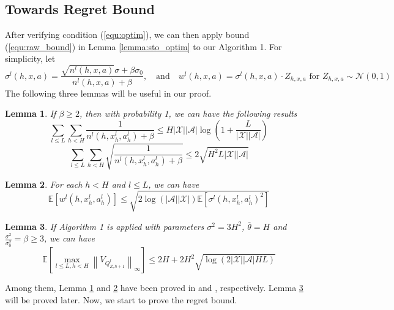 \documentclass[letterpaper]{article} %
\newcommand{\Sp}[1]{\left(#1\right)}
\newcommand{\Mp}[1]{\left[#1\right]}
\newcommand{\abs}[1]{\left|#1\right|}
\newcommand{\Norm}[1]{\left\|#1\right\|}
\newcommand{\E}{\mathbb{E}}
\newcommand{\aX}{\abs{\mathcal{X}}}
\newcommand{\aA}{\abs{\mathcal{A}}}
\newtheorem{lemma}{Lemma}
\theoremstyle{definition}
\begin{document}
\subsection{Towards Regret Bound}
After verifying condition (\ref{equ:optim}), we can then apply bound (\ref{equ:raw_bound}) in Lemma \ref{lemma:sto_optim} to our Algorithm 1. For simplicity, let
\begin{equation}
\label{equ:simp}
\sigma^l\Sp{h, x, a}=\frac{\sqrt{n^l\Sp{h, x, a}}\sigma+\beta\sigma_0}{n^l\Sp{h, x, a}+\beta},\quad\text{and}\quad w^l\Sp{h, x, a}=\sigma^l\Sp{h, x, a}\cdot Z_{h, x, a}\text{ for }Z_{h, x, a}\sim\mathcal{N}\Sp{0, 1}
\end{equation}
The following three lemmas will be useful in our proof. 
\begin{lemma}
	\label{lemma:sum_bound}
	If $\beta\geq 2$, then with probability 1, we can have the following results
	$$\sum_{l\leq L}\sum_{h< H}\frac{1}{n^l\Sp{h, x_h^l, a_h^l}+\beta}\leq H\aX\aA\log\Sp{1+\frac{L}{\aX\aA}}$$
	$$\sum_{l\leq L}\sum_{h< H}\sqrt{\frac{1}{n^l\Sp{h, x_h^l, a_h^l}+\beta}}\leq 2\sqrt{H^2L\aX\aA}$$
\end{lemma}
\begin{lemma}
	\label{lemma:expect_w}
	For each $h< H$ and $l\leq L$, we can have
	$$\E\Mp{w^l\Sp{h, x_h^l, a_h^l}}\leq\sqrt{2\log\Sp{\aA\aX}\E\Mp{\sigma^l\Sp{h, x_h^l, a_h^l}^2}}$$
\end{lemma}
\begin{lemma}
	\label{lemma:maxV_bound}
	If Algorithm 1 is applied with parameters $\sigma^2=3H^2$, $\bar{\theta}=H$ and $\frac{\sigma^2}{\sigma_0^2}=\beta\geq 3$, we can have
	$$\E\Mp{\max_{l\leq L, h< H}\Norm{V_{Q^l_{Z, h+1}}}_{\infty}}\leq 2H+2H^2\sqrt{\log\Sp{2\aX\aA HL}}$$
\end{lemma}
Among them, Lemma \ref{lemma:sum_bound} and \ref{lemma:expect_w} have been proved in \cite{osband2017deep} and \cite{russo2015much}, respectively. Lemma \ref{lemma:maxV_bound} will be proved later. Now, we start to prove the regret bound.  
\end{document}
